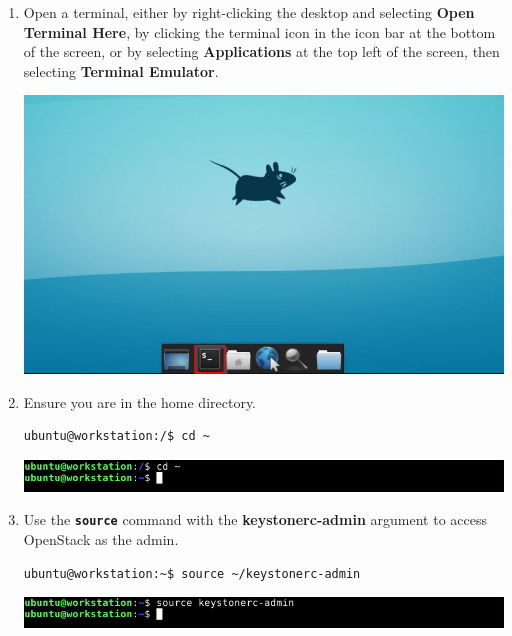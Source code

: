 \documentclass[letterpaper, 12pt]{article}
\begin{document}
\begin{enumerate}    
    \item Open a terminal, either by right-clicking the desktop and selecting \textbf{Open Terminal Here}, by clicking
    the terminal icon in the icon bar at the bottom of the screen, or by selecting \textbf{Applications} at the top
    left of the screen, then selecting \textbf{Terminal Emulator}.

    \begin{center}
        \includegraphics[width=\linewidth]{images/part_2_step_1.png}
    \end{center}

    \item Ensure you are in the home directory.
\begin{lstlisting}
ubuntu@workstation:/$ cd ~
\end{lstlisting}
    
    \begin{center}
        \includegraphics[width=\linewidth]{images/part_2_step_2.png}
    \end{center}

    \item Use the \textbf{\texttt{source}} command with the \textbf{keystonerc-admin} argument to access OpenStack
    as the admin.
\begin{lstlisting}
ubuntu@workstation:~$ source ~/keystonerc-admin
\end{lstlisting}
    
    \begin{center}
        \includegraphics[width=\linewidth]{images/part_2_step_3.png}
    \end{center}


\end{enumerate}
\end{document}
